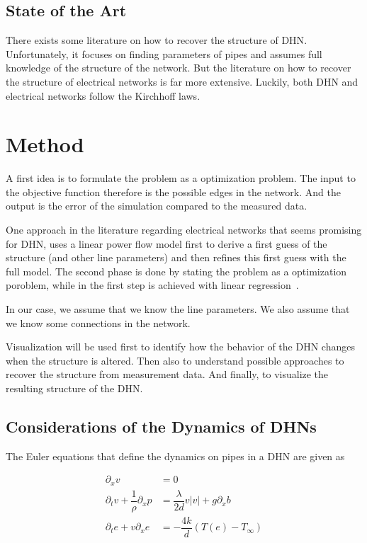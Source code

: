 \documentclass{scrartcl}
\begin{document}
    \subsection{State of the Art}

    There exists some literature on how to recover the structure of \ac{DHN}.
    Unfortunately, it focuses on finding parameters of pipes and assumes full knowledge of the structure of the network.
    But the literature on how to recover the structure of electrical networks is far more extensive.
    Luckily, both \ac{DHN} and electrical networks follow the Kirchhoff laws.

    \section{Method}

    A first idea is to formulate the problem as a optimization problem.
    The input to the objective function therefore is the possible edges in the network.
    And the output is the error of the simulation compared to the measured data.

    One approach in the literature regarding electrical networks that seems promising for \ac{DHN}, uses a linear power flow model first to derive a first guess of the structure (and other line parameters) and then refines this first guess with the full model.
    The second phase is done by stating the problem as a optimization poroblem, while in the first step is achieved with linear regression~\cite{wang2024identification}.

    In our case, we assume that we know the line parameters.
    We also assume that we know some connections in the network.

    Visualization will be used first to identify how the behavior of the \ac{DHN} changes when the structure is altered.
    Then also to understand possible approaches to recover the structure from measurement data.
    And finally, to visualize the resulting structure of the \ac{DHN}.

    \subsection{Considerations of the Dynamics of \acp{DHN}}

    The Euler equations that define the dynamics on pipes in a \ac{DHN} are given as

    \begin{subequations}
    \begin{align}
      \partial_x v & = 0 \\
      \partial_t v + \dfrac{1}{\rho} \partial_x p & = \dfrac{\lambda}{2d} v |v| + g \partial_x b \label{eq:pipe-mass-flux} \\
      \partial_t e + v \partial_x e & = - \dfrac{4k}{d} (T(e) - T_\infty) \label{eq:pipe-energy-flux}
    \end{align}
    \end{subequations}
    \hfill\cite{eimer2022modeling}
\end{document}
